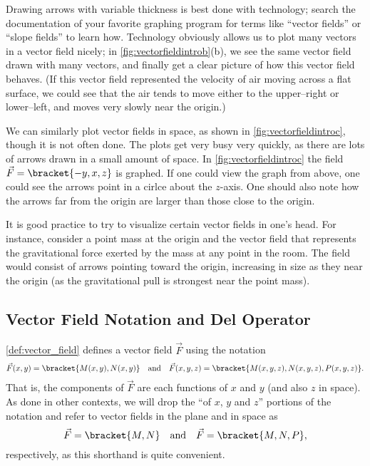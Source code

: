 Drawing arrows with variable thickness is best done with technology; search the documentation of your favorite graphing program for terms like ``vector fields'' or ``slope fields'' to learn how. Technology obviously allows us to plot many vectors in a vector field nicely; in \autoref{fig:vectorfieldintrob}(b), we see the same vector field drawn with many vectors, and finally get a clear picture of how this vector field behaves. (If this vector field represented the velocity of air moving across a flat surface, we could see that the air tends to move either to the upper--right or lower--left, and moves very slowly near the origin.)


We can similarly plot vector fields in space, as shown in \autoref{fig:vectorfieldintroc}, though it is not often done. The plots get very busy very quickly, as there are lots of arrows drawn in a small amount of space. In \autoref{fig:vectorfieldintroc} the field $\vec F =\bracket{-y,x,z}$ is graphed. If one could view the graph from above, one could see the arrows point in a cirlce about the $z$-axis. One should also note how the arrows far from the origin are larger than those close to the origin. 

It is good practice to try to visualize certain vector fields in one's head. For instance, consider a point mass at the origin and the vector field that represents the gravitational force exerted by the mass at any point in the room. The field would consist of arrows pointing toward the origin, increasing in size as they near the origin (as the gravitational pull is strongest near the point mass).


\subsection{Vector Field Notation and Del Operator}

\autoref{def:vector_field} defines a vector field $\vec F$ using the notation \[
\vec F(x,y) =\bracket{M(x,y), N(x,y)}
\quad \text{and}\quad
\vec F(x,y,z) =\bracket{M(x,y,z), N(x,y,z),P(x,y,z)}.
\]
That is, the components of $\vec F$ are each functions of $x$ and $y$ (and also $z$ in space). As done in other contexts, we will drop the ``of $x$, $y$ and $z$'' portions of the notation and refer to vector fields in the plane and in space as 
\[\vec F =\bracket{M, N}\quad \text{and} \quad \vec F  =\bracket{M,N,P},\]
respectively, as this shorthand is quite convenient.

